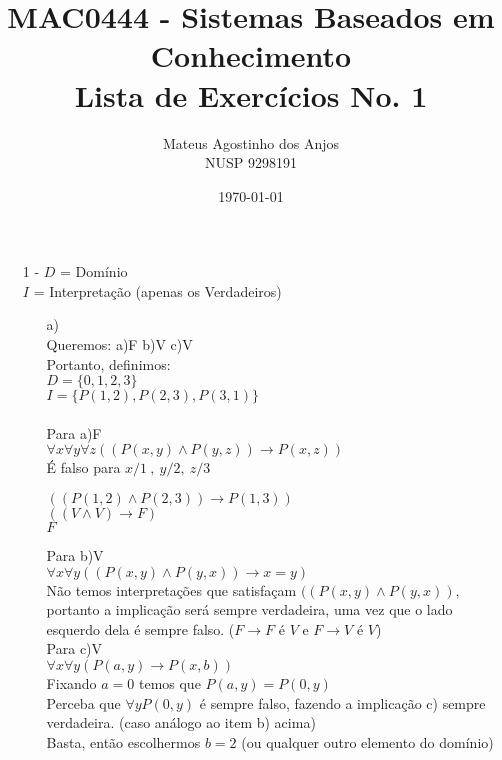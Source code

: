 \documentclass[12pt]{article}
\title{MAC0444 - Sistemas Baseados em Conhecimento \\
Lista de Exercícios No. 1
}
\author{Mateus Agostinho dos Anjos\\NUSP 9298191}
\date{\today}
\begin{document}
	\maketitle
	\begin{itemize}
		\item[1 -]
			$D$ = Domínio\\
			$I$ = Interpretação (apenas os Verdadeiros)\\
			\begin{itemize}
				\item[a)]
					\hfill\\
					Queremos: a)F b)V c)V\\
					Portanto, definimos:\\
					$D = \lbrace 0, 1, 2, 3 \rbrace$\\
					$I = \lbrace P(1, 2), P(2, 3), P(3, 1) \rbrace$\\ \\
					Para a)F\\
					$\forall x \forall y \forall z ((P(x,y) \wedge P(y,z)) \rightarrow P(x, z))$\\
					É falso para $x/1 \ , \ y/2, \ z/3$\\
					\begin{center}	
						$((P(1,2) \wedge P(2,3)) \rightarrow P(1, 3))$\\
						$((V \wedge V) \rightarrow F)$\\
						$F$
					\end{center}
					Para b)V\\
					$\forall x \forall y ((P(x,y) \wedge P(y,x)) \rightarrow x = y)$\\
					Não temos interpretações que satisfaçam $((P(x,y) \wedge P(y,x))$, portanto
					a implicação será sempre verdadeira, uma vez que o lado esquerdo dela é
					sempre falso. ($F \rightarrow F$ é $V$ e $F \rightarrow V$ é $V$)\\
					
					Para c)V\\
					$\forall x \forall y (P(a,y) \rightarrow P(x, b))$\\
					Fixando $a = 0$ temos que $P(a, y) = P(0, y)$\\
					Perceba que $\forall y P(0, y)$ é sempre falso, fazendo a implicação c)
					sempre verdadeira. (caso análogo ao item b) acima)\\
					Basta, então escolhermos $b = 2$ (ou qualquer outro elemento do domínio)
					

\end{itemize}
\end{itemize}
\end{document}
